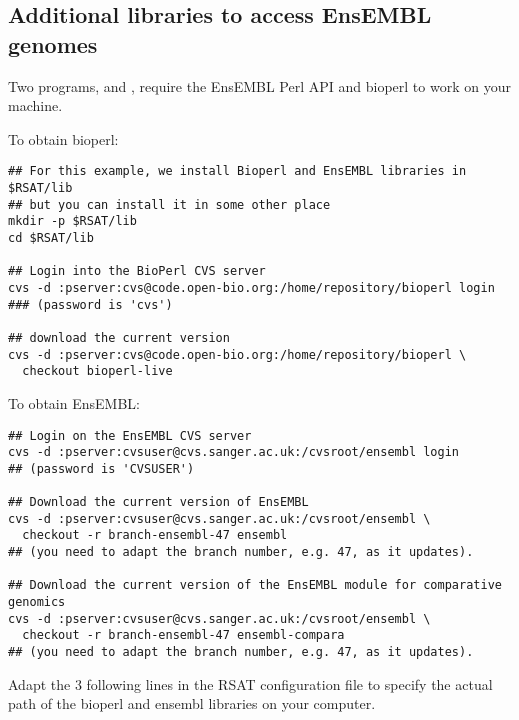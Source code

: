 \documentclass{book}
\begin{document}
\subsection{Additional libraries to access EnsEMBL genomes}

Two programs,  and
, require the EnsEMBL Perl API and
bioperl to work on your machine.

To obtain bioperl:

\begin{footnotesize}
\begin{verbatim}
## For this example, we install Bioperl and EnsEMBL libraries in $RSAT/lib
## but you can install it in some other place
mkdir -p $RSAT/lib
cd $RSAT/lib

## Login into the BioPerl CVS server
cvs -d :pserver:cvs@code.open-bio.org:/home/repository/bioperl login
### (password is 'cvs')

## download the current version
cvs -d :pserver:cvs@code.open-bio.org:/home/repository/bioperl \
  checkout bioperl-live

\end{verbatim}
\end{footnotesize}


To obtain EnsEMBL:

\begin{footnotesize}
\begin{verbatim}
## Login on the EnsEMBL CVS server
cvs -d :pserver:cvsuser@cvs.sanger.ac.uk:/cvsroot/ensembl login
## (password is 'CVSUSER')

## Download the current version of EnsEMBL
cvs -d :pserver:cvsuser@cvs.sanger.ac.uk:/cvsroot/ensembl \
  checkout -r branch-ensembl-47 ensembl
## (you need to adapt the branch number, e.g. 47, as it updates).

## Download the current version of the EnsEMBL module for comparative genomics
cvs -d :pserver:cvsuser@cvs.sanger.ac.uk:/cvsroot/ensembl \
  checkout -r branch-ensembl-47 ensembl-compara
## (you need to adapt the branch number, e.g. 47, as it updates).
\end{verbatim}
\end{footnotesize}

Adapt the 3 following lines in the RSAT configuration file
 to specify the actual path of the bioperl
and ensembl libraries on your computer.
\end{document}

